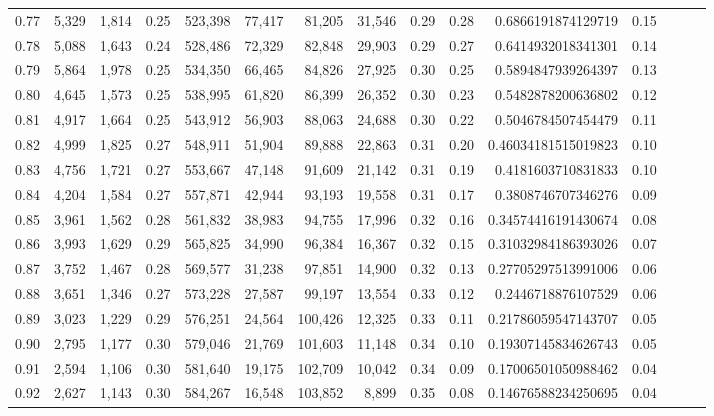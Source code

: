 \begin{tabular}{rrrrrrrrrrrrrrr}
0.77 &   5,329 &  1,814 &  0.25 &  523,398 &   77,417 &   81,205 &   31,546 &  0.29 &  0.28 &    0.6866191874129719 &      0.15 \\
0.78 &   5,088 &  1,643 &  0.24 &  528,486 &   72,329 &   82,848 &   29,903 &  0.29 &  0.27 &    0.6414932018341301 &      0.14 \\
0.79 &   5,864 &  1,978 &  0.25 &  534,350 &   66,465 &   84,826 &   27,925 &  0.30 &  0.25 &    0.5894847939264397 &      0.13 \\
0.80 &   4,645 &  1,573 &  0.25 &  538,995 &   61,820 &   86,399 &   26,352 &  0.30 &  0.23 &    0.5482878200636802 &      0.12 \\
0.81 &   4,917 &  1,664 &  0.25 &  543,912 &   56,903 &   88,063 &   24,688 &  0.30 &  0.22 &    0.5046784507454479 &      0.11 \\
0.82 &   4,999 &  1,825 &  0.27 &  548,911 &   51,904 &   89,888 &   22,863 &  0.31 &  0.20 &   0.46034181515019823 &      0.10 \\
0.83 &   4,756 &  1,721 &  0.27 &  553,667 &   47,148 &   91,609 &   21,142 &  0.31 &  0.19 &    0.4181603710831833 &      0.10 \\
0.84 &   4,204 &  1,584 &  0.27 &  557,871 &   42,944 &   93,193 &   19,558 &  0.31 &  0.17 &    0.3808746707346276 &      0.09 \\
0.85 &   3,961 &  1,562 &  0.28 &  561,832 &   38,983 &   94,755 &   17,996 &  0.32 &  0.16 &   0.34574416191430674 &      0.08 \\
0.86 &   3,993 &  1,629 &  0.29 &  565,825 &   34,990 &   96,384 &   16,367 &  0.32 &  0.15 &   0.31032984186393026 &      0.07 \\
0.87 &   3,752 &  1,467 &  0.28 &  569,577 &   31,238 &   97,851 &   14,900 &  0.32 &  0.13 &   0.27705297513991006 &      0.06 \\
0.88 &   3,651 &  1,346 &  0.27 &  573,228 &   27,587 &   99,197 &   13,554 &  0.33 &  0.12 &    0.2446718876107529 &      0.06 \\
0.89 &   3,023 &  1,229 &  0.29 &  576,251 &   24,564 &  100,426 &   12,325 &  0.33 &  0.11 &   0.21786059547143707 &      0.05 \\
0.90 &   2,795 &  1,177 &  0.30 &  579,046 &   21,769 &  101,603 &   11,148 &  0.34 &  0.10 &   0.19307145834626743 &      0.05 \\
0.91 &   2,594 &  1,106 &  0.30 &  581,640 &   19,175 &  102,709 &   10,042 &  0.34 &  0.09 &   0.17006501050988462 &      0.04 \\
0.92 &   2,627 &  1,143 &  0.30 &  584,267 &   16,548 &  103,852 &    8,899 &  0.35 &  0.08 &   0.14676588234250695 &      0.04 \\

\end{tabular}
